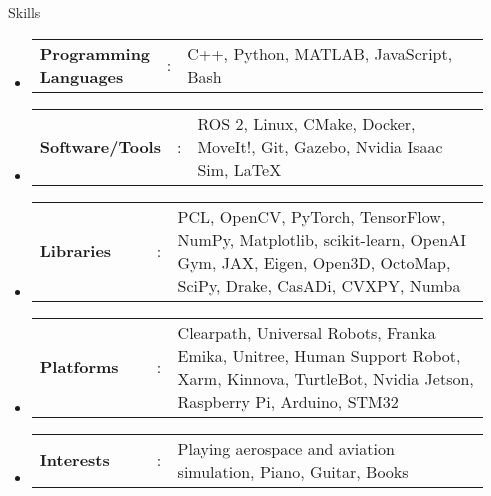 \documentclass{resume}
\newcommand{\resumeHeadingListStart}{
  \begin{itemize}[leftmargin=0.15in, label={}]
    
}
\newcommand{\resumeHeadingListEnd}{\end{itemize}}
\newcommand{\resumeSectionType}[3]{
  \hspace{-1.3em}\item\begin{tabular*}{0.5\textwidth}[t]{
    p{0.25\linewidth}p{0.02\linewidth}p{0.67\linewidth}
  }
  \normalsize
    \textbf{#1} & #2 & {#3}
  \end{tabular*}\vspace{-8pt}
}
\begin{document}
\vspace{-0.5em}
\begin{rSection}{Skills}
\resumeHeadingListStart{}
\resumeSectionType{Programming Languages}{:}{C++, Python, MATLAB, JavaScript, Bash}
\resumeSectionType{Software/Tools}{:}{ROS 2, Linux, CMake, Docker, MoveIt!, Git, Gazebo, Nvidia Isaac Sim, \LaTeX}
\resumeSectionType{Libraries}{:}{PCL, OpenCV, PyTorch, TensorFlow, NumPy, Matplotlib, scikit-learn,  OpenAI Gym, JAX, Eigen, Open3D, OctoMap, SciPy, Drake, CasADi, CVXPY, Numba}
\resumeSectionType{Platforms}{:}{Clearpath, Universal Robots, Franka Emika, Unitree, Human Support Robot, Xarm, Kinnova, TurtleBot, Nvidia Jetson, Raspberry Pi, Arduino, STM32}
\resumeSectionType{Interests}{:}{Playing aerospace and aviation simulation, Piano, Guitar, Books}
\resumeHeadingListEnd{}
\end{rSection}






\newpage
\thispagestyle{reference}
\end{document}

